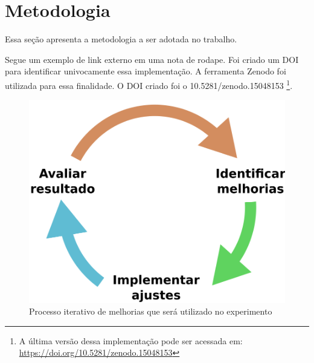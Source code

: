 \chapter{Metodologia}\label{cap:metodologia}

Essa seção apresenta a metodologia a ser adotada no trabalho.

Segue um exemplo de link externo em uma nota de rodape. Foi criado um DOI para identificar univocamente essa implementação. A ferramenta Zenodo foi utilizada para essa finalidade. O DOI criado foi o 10.5281/zenodo.15048153 \footnote{A última versão dessa implementação pode ser acessada em: \url{https://doi.org/10.5281/zenodo.15048153}}.

\lipsum[37-38]

\begin{figure}[ht]
    \centering
    \includegraphics[width=0.4\linewidth]{figuras/metodologia.png}
    \caption{Processo iterativo de melhorias que será utilizado no experimento}
    \label{fig:metodologia}
\end{figure}

\lipsum[39-41]